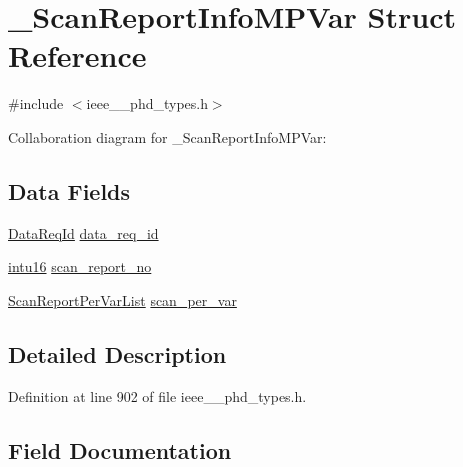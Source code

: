 \hypertarget{struct___scan_report_info_m_p_var}{}\section{\+\_\+\+Scan\+Report\+Info\+M\+P\+Var Struct Reference}
\label{struct___scan_report_info_m_p_var}


{\ttfamily \#include $<$ieee\+\_\+\_\+phd\+\_\+types.\+h$>$}



Collaboration diagram for \+\_\+\+Scan\+Report\+Info\+M\+P\+Var\+:
\subsection*{Data Fields}
\begin{DoxyCompactItemize}
\item 
\hyperlink{ieee__11073__phd__types_8h_ab2d118926c6a08395e5d075382450ae0}{Data\+Req\+Id} \hyperlink{struct___scan_report_info_m_p_var_a1c786af4096ed61c5f6cfdf27f317b70}{data\+\_\+req\+\_\+id}
\item 
\hyperlink{ieee__11073__phd__types_8h_a3561595d2aa7416532e1c9910abd076d}{intu16} \hyperlink{struct___scan_report_info_m_p_var_a21f75132869d4d200ffe01d91b4736d8}{scan\+\_\+report\+\_\+no}
\item 
\hyperlink{ieee__11073__phd__types_8h_a4d2c5409c28023c229210ca0fc1171d9}{Scan\+Report\+Per\+Var\+List} \hyperlink{struct___scan_report_info_m_p_var_add9d65a66abeff2778defd0ade1a9dcd}{scan\+\_\+per\+\_\+var}
\end{DoxyCompactItemize}


\subsection{Detailed Description}


Definition at line 902 of file ieee\+\_\+\_\+phd\+\_\+types.\+h.



\subsection{Field Documentation}
\hypertarget{struct___scan_report_info_m_p_var_a1c786af4096ed61c5f6cfdf27f317b70}{}

